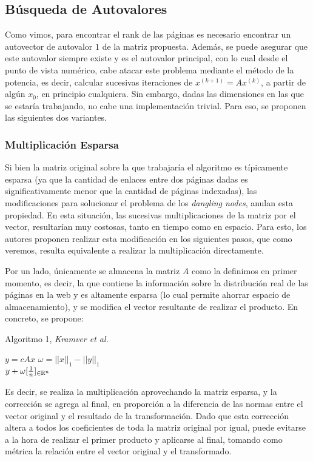 \subsection{Búsqueda de Autovalores}
Como vimos, para encontrar el rank de las páginas es necesario encontrar un autovector de autovalor $1$ de la matriz propuesta. Además, se puede asegurar que este autovalor siempre existe y es el autovalor principal, con lo cual desde el punto de vista numérico, cabe atacar este problema mediante el método de la potencia, es decir, calcular sucesivas iteraciones de $x^{(k+1)} = Ax^{(k)}$, a partir de algún $x_0$, en principio cualquiera.
Sin embargo, dadas las dimensiones en las que se estaría trabajando, no cabe una implementación trivial. Para eso, se proponen las siguientes dos variantes.

\subsubsection{Multiplicación Esparsa}
Si bien la matriz original sobre la que trabajaría el algoritmo es típicamente esparsa (ya que la cantidad de enlaces entre dos páginas dadas es significativamente menor que la cantidad de páginas indexadas), las modificaciones para solucionar el problema de los \emph{dangling nodes}, anulan esta propiedad. En esta situación, las sucesivas multiplicaciones de la matriz por el vector, resultarían muy costosas, tanto en tiempo como en espacio. Para esto, los autores proponen realizar esta modificación en los siguientes pasos, que como veremos, resulta equivalente a realizar la multiplicación directamente.

Por un lado, únicamente se almacena la matriz $A$ como la definimos en primer momento, es decir, la que contiene la información sobre la distribución real de las páginas en la web y es altamente esparsa (lo cual permite ahorrar espacio de almacenamiento), y se modifica el vector resultante de realizar el producto.
En concreto, se propone:
\begin{algorithm}
\caption*{Algoritmo 1, \emph{Kramver et al.}}
\begin{algorithmic}
\State $y = cAx$
\State $\omega = ||x||_1 - ||y||_1$\\
\Return $y + \omega [\frac{1}{n}]_{\in \mathbb{R}^n}$

\end{algorithmic}
\end{algorithm}

Es decir, se realiza la multiplicación aprovechando la matriz esparsa, y la corrección se agrega al final, en proporción a la diferencia de las normas entre el vector original y el resultado de la transformación. Dado que esta corrección altera a todos los coeficientes de toda la matriz original por igual, puede evitarse a la hora de realizar el primer producto y aplicarse al final, tomando como métrica la relación entre el vector original y el transformado.

